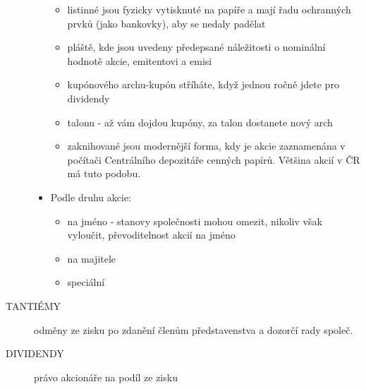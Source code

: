\begin{description}
\begin{itemize}
\begin{itemize}
                                \item listinné jsou fyzicky vytisknuté na papíře a mají řadu ochranných prvků (jako bankovky), aby se nedaly padělat
                                \item pláště, kde jsou uvedeny předepsané náležitosti o nominální hodnotě akcie, emitentovi a emisi
                                \item kupónového archu-kupón stříháte, když jednou ročně jdete pro dividendy
                                \item talonu - až vám dojdou kupóny, za talon dostanete nový arch
                                \item zaknihované jsou modernější forma, kdy je akcie zaznamenána v počítači Centrálního depozitáře cenných papírů. Většina akcií v ČR má tuto podobu.								
                            \end{itemize}
                        \item Podle druhu akcie:
                            \begin{itemize}
                                \item na jméno - stanovy společnosti mohou omezit, nikoliv však vyloučit, převoditelnost akcií na jméno
                                \item na majitele
                                \item speciální
                            \end{itemize}
                    \end{itemize}
                \item[TANTIÉMY] odměny ze zisku po zdanění členům představenstva a dozorčí rady společ.
                \item[DIVIDENDY] právo akcionáře na podíl ze zisku
            \end{description}
